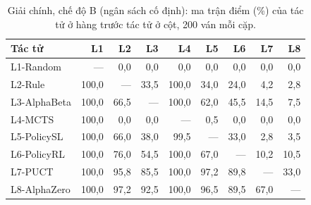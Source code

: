 \begin{table}[H]
  \centering\footnotesize
  \caption{Giải chính, chế độ B (ngân sách cố định): ma trận điểm (\%) của tác tử ở hàng trước tác tử ở cột, 200 ván mỗi cặp.}
  \label{tab:giai-b-matran}
  \setlength{\tabcolsep}{4pt}
  \begin{tabular}{@{}lrrrrrrrr@{}}
    \toprule
    Tác tử & L1 & L2 & L3 & L4 & L5 & L6 & L7 & L8 \\
    \midrule
    L1-Random & --- & 0{,}0 & 0{,}0 & 0{,}0 & 0{,}0 & 0{,}0 & 0{,}0 & 0{,}0 \\
    L2-Rule & 100{,}0 & --- & 33{,}5 & 100{,}0 & 34{,}0 & 24{,}0 & 4{,}2 & 2{,}8 \\
    L3-AlphaBeta & 100{,}0 & 66{,}5 & --- & 100{,}0 & 62{,}0 & 45{,}5 & 14{,}5 & 7{,}5 \\
    L4-MCTS & 100{,}0 & 0{,}0 & 0{,}0 & --- & 0{,}5 & 0{,}0 & 0{,}0 & 0{,}0 \\
    L5-PolicySL & 100{,}0 & 66{,}0 & 38{,}0 & 99{,}5 & --- & 33{,}0 & 2{,}8 & 3{,}5 \\
    L6-PolicyRL & 100{,}0 & 76{,}0 & 54{,}5 & 100{,}0 & 67{,}0 & --- & 10{,}2 & 10{,}5 \\
    L7-PUCT & 100{,}0 & 95{,}8 & 85{,}5 & 100{,}0 & 97{,}2 & 89{,}8 & --- & 33{,}0 \\
    L8-AlphaZero & 100{,}0 & 97{,}2 & 92{,}5 & 100{,}0 & 96{,}5 & 89{,}5 & 67{,}0 & --- \\
    \bottomrule
  \end{tabular}
\end{table}
